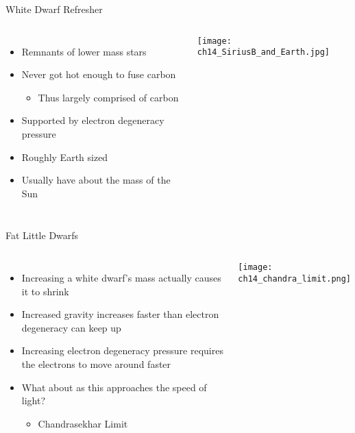 \documentclass[pdf,aspectratio=169]{beamer}
\begin{document}
\begin{frame}{White Dwarf Refresher}
  \begin{columns}
	\begin{itemize}
	  \item Remnants of lower mass stars
	  \item Never got hot enough to fuse carbon
		\begin{itemize}
		  \item Thus largely comprised of carbon
		\end{itemize}
	  \item Supported by electron degeneracy pressure
	  \item Roughly Earth sized
	  \item Usually have about the mass of the Sun
	\end{itemize}
	\begin{center}
	  \texttt{[image: ch14\_SiriusB\_and\_Earth.jpg]}
	\end{center}
  \end{columns}
\end{frame}

\begin{frame}{Fat Little Dwarfs}
  \begin{columns}
	\begin{itemize}
	  \item Increasing a white dwarf's mass actually causes it to shrink
	  \item Increased gravity increases faster than electron degeneracy can keep up
	  \item Increasing electron degeneracy pressure requires the electrons to move around faster
	  \item What about as this approaches the speed of light?
		\begin{itemize}
		  \item Chandrasekhar Limit
		\end{itemize}
	\end{itemize}
	\begin{center}
	  \texttt{[image: ch14\_chandra\_limit.png]}
	\end{center}
  \end{columns}
\end{frame}
\end{document}
